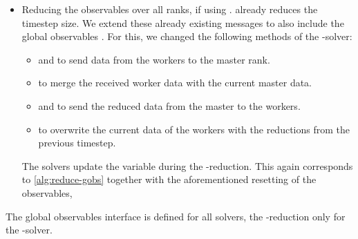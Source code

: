 \begin{itemize}
\begin{itemize}
  \end{itemize}
\item Reducing the observables over all ranks, if using \mpi{}.
  \exahype{} already reduces the timestep size.
  We extend these already existing \mpi{} messages to also include the global observables .
  For this, we changed the following methods of the \dg{}-solver:
  \begin{itemize}
  \item {} and  to send data from the workers to the master rank.
  \item {} to merge the received worker data with the current master data. 
  \item {} and  to send the reduced data from the master to the workers.
  \item {} to overwrite the current data of the workers with the reductions from the previous timestep.
  \end{itemize}
  The solvers update the variable  during the \mpi{}-reduction.
  This again corresponds to \cref{alg:reduce-gobs} together with the aforementioned resetting of the observables, 
\end{itemize}
The global observables interface is defined for all solvers, the \mpi{}-reduction only for the \aderdg{}-solver.

